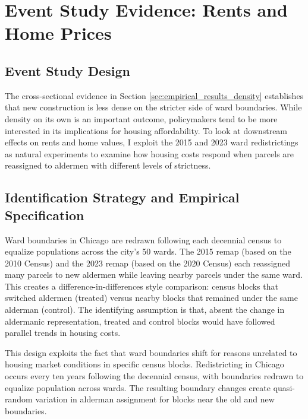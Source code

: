 \section{Event Study Evidence: Rents and Home Prices}
\label{sec:empirical_results_rent_home_vals}

\subsection{Event Study Design}
The cross-sectional evidence in Section \ref{sec:empirical_results_density} establishes that new construction is less dense on the stricter side of ward boundaries.
While density on its own is an important outcome, policymakers tend to be more interested in its implications for housing affordability.
To look at downstream effects on rents and home values, I exploit the 2015 and 2023 ward redistrictings as natural experiments to examine how housing costs respond when parcels are reassigned to aldermen with different levels of strictness.

\subsection{Identification Strategy and Empirical Specification}
\label{sec:identification_strategy}

Ward boundaries in Chicago are redrawn following each decennial census to equalize populations across the city's 50 wards. The 2015 remap (based on the 2010 Census) and the 2023 remap (based on the 2020 Census) each reassigned many parcels to new aldermen while leaving nearby parcels under the same ward. This creates a difference-in-differences style comparison: census blocks that switched aldermen (treated) versus nearby blocks that remained under the same alderman (control). The identifying assumption is that, absent the change in aldermanic representation, treated and control blocks would have followed parallel trends in housing costs.

This design exploits the fact that ward boundaries shift for reasons unrelated to housing market conditions in specific census blocks. Redistricting in Chicago occurs every ten years following the decennial census, with boundaries redrawn to equalize population across wards. The resulting boundary changes create quasi-random variation in alderman assignment for blocks near the old and new boundaries.

